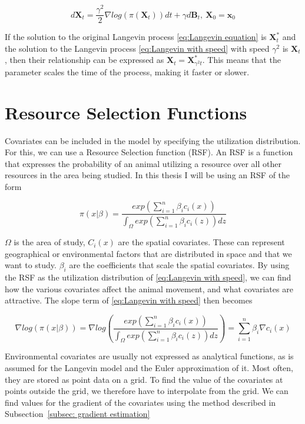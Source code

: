 \begin{equation}
    d\textbf{X}_t = \frac{\gamma^2}{2} \nabla log(\pi(\textbf{X}_t))dt + \gamma d\textbf{B}_t, \ \textbf{X}_0 = \textbf{x}_0
    \label{eq:Langevin with speed}
\end{equation}


If the solution to the original Langevin process \eqref{eq:Langevin equation} is $\textbf{X}^*_t$ and the solution to the Langevin process \eqref{eq:Langevin with speed} with speed $\gamma^2$ is $\textbf{X}_t$, then their relationship can be expressed as $\textbf{X}_t = \textbf{X}^*_{\gamma^2 t}$. This means that the parameter scales the time of the process, making it faster or slower.


\section{Resource Selection Functions}

Covariates can be included in the model by specifying the utilization distribution. For this, we can use a Resource Selection function (RSF). An RSF is a function that expresses the probability of an animal utilizing a resource over all other resources in the area being studied. In this thesis I will be using an RSF of the form


\begin{equation}
    \pi(x|\beta) = \frac{exp(\sum_{i=1}^n\beta_i c_i(x))}{\int_\Omega exp(\sum_{i=1}^n\beta_i c_i(z))dz}
    \label{eq: resource selection function}
\end{equation}

$\Omega$ is the area of study, $C_i(x)$ are the spatial covariates. These can represent geographical or environmental factors that are distributed in space and that we want to study. $\beta_i$ are the coefficients that scale the spatial covariates. By using the RSF as the utilization distribution of \eqref{eq:Langevin with speed}, we can find how the various covariates affect the animal movement, and what covariates are attractive. The slope term of \eqref{eq:Langevin with speed} then becomes

\begin{equation}
    \nabla log(\pi(x|\beta)) = \nabla log(\frac{exp(\sum_{i=1}^n\beta_i c_i(x))}{\int_\Omega exp(\sum_{i=1}^n\beta_i c_i(z))dz}) =\sum_{i=1}^n \beta_i \nabla c_i(x)
\end{equation}



Environmental covariates are usually not expressed as analytical functions, as is assumed for the Langevin model and the Euler approximation of it. Most often, they are stored as point data on a grid. To find the value of the covariates at points outside the grid, we therefore have to interpolate from the grid. We can find values for the gradient of the covariates using the method described in Subsection~\ref{subsec: gradient estimation}


